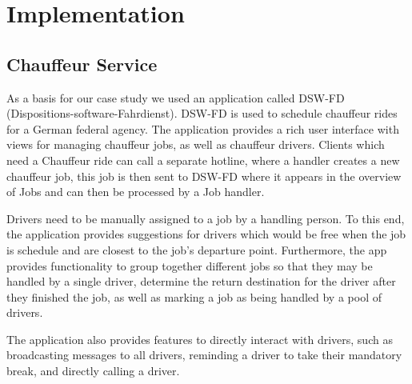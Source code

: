 \chapter{Implementation}
\label{ch:implementation}


\section{Chauffeur Service}


As a basis for our case study we used an application called DSW-FD (Dispositions-software-Fahrdienst). DSW-FD is used to schedule chauffeur rides for a German federal agency. The application provides a rich user interface with views for managing chauffeur jobs, as well as chauffeur drivers. Clients which need a Chauffeur ride can call a separate hotline, where a handler creates a new chauffeur job, this job is then sent to DSW-FD where it appears in the overview of Jobs and can then be processed by a Job handler.

Drivers need to be manually assigned to a job by a handling person. To this end, the application provides suggestions for drivers which would be free when the job is schedule and are closest to the job's departure point. Furthermore, the app provides functionality to group together different jobs so that they may be handled by a single driver, determine the return destination for the driver after they finished the job, as well as marking a job as being handled by a pool of drivers.

The application also provides features to directly interact with drivers, such as broadcasting messages to all drivers, reminding a driver to take their mandatory break, and directly calling a driver.

